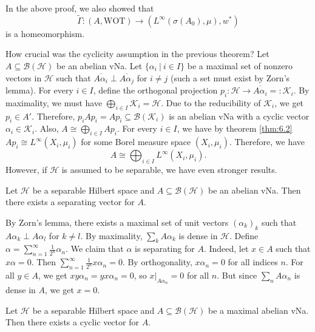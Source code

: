 \begin{remark}
  In the above proof, we also showed that 
  $$\widetilde{\Gamma}: (A, \textrm{WOT}) \to (L^\infty (\sigma(A_0), \mu), w^*)$$
  is a homeomorphism.
\end{remark}

How crucial was the cyclicity assumption in the previous theorem?
Let $A \subseteq \mathcal{B}(\mathcal{H})$ be an abelian vNa. 
Let $\{\alpha_i\ |\ i \in I\}$ be a maximal set of nonzero vectors in $\mathcal{H}$
such that $\overline{A \alpha_i} \perp \overline{A \alpha_j}$ for $i \neq j$ (such a set must exist by Zorn's lemma).
For every $i \in I$, define the orthogonal projection $p_i: \mathcal{H} \to \overline{A \alpha_i} =: \mathcal{K}_i$.
By maximality, we must have $\bigoplus_{i \in I} \mathcal{K}_i = \mathcal{H}$.
Due to the reducibility of $\mathcal{K}_i$, we get $p_i \in A'$. Therefore, $p_i A p_i = A p_i \subseteq \mathcal{B}(\mathcal{K}_i)$
is an abelian vNa with a cyclic vector $\alpha_i \in \mathcal{K}_i$. Also, 
$A \cong \bigoplus_{i \in I} A p_i$.
For every $i \in I$, we have by theorem \ref{thm:6.2} $A p_i \cong L^\infty(X_i, \mu_i)$ for some Borel measure space $(X_i, \mu_i)$.
Therefore, we have 
$$A \cong \bigoplus_{i \in I} L^\infty(X_i, \mu_i).$$
However, if $\mathcal{H}$ is assumed to be separable, we have even stronger results.

\begin{proposition}\label{prop:6.2}
  Let $\mathcal{H}$ be a separable Hilbert space and $A \subseteq \mathcal{B}(\mathcal{H})$
  be an abelian vNa. Then there exists a separating vector for $A$.
\end{proposition}

\begin{myproof}
  By Zorn's lemma, there exists a maximal set of unit vectors $(\alpha_k)_k$ such that $A \alpha_k \perp A \alpha_l$
  for $k \neq l$. By maximality, $\sum_k A \alpha_k$ is dense in $\mathcal{H}$.
  Define $\alpha = \sum_{n = 1}^\infty \frac{1}{2^n} \alpha_n$. We claim that $\alpha$ is separating for $A$.
  Indeed, let $x \in A$ such that $x \alpha = 0$. Then $\sum_{n = 1}^\infty \frac{1}{2^n} x \alpha_n = 0$.
  By orthogonality, $x \alpha_n = 0$ for all indices $n$. For all $y \in A$, we get 
  $x y \alpha_n = y x \alpha_n = 0$, so $x\big|_{A \alpha_n} = 0$ for all $n$. But since $\sum_n A \alpha_n$ is dense in $A$, we get $x = 0$.
\end{myproof}

\begin{corollary}
  Let $\mathcal{H}$ be a separable Hilbert space and $A \subseteq \mathcal{B}(\mathcal{H})$
  be a maximal abelian vNa. Then there exists a cyclic vector for $A$.
\end{corollary}

